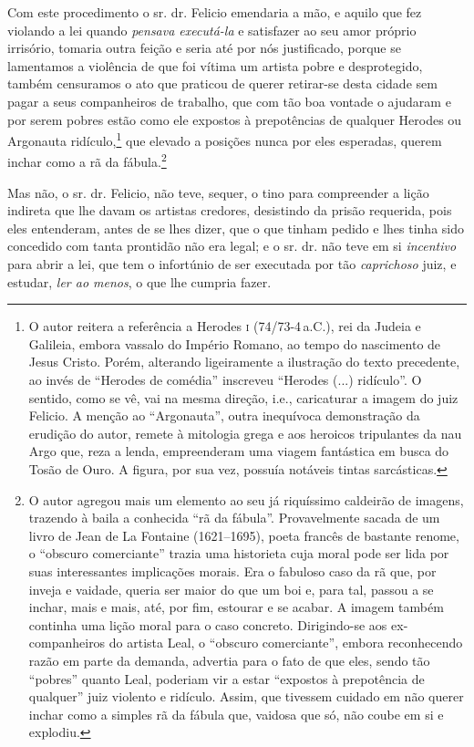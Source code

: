 Com este procedimento o sr. dr. Felicio emendaria a mão, e aquilo que
fez violando a lei quando \emph{pensava executá-la} e satisfazer ao seu
amor próprio irrisório, tomaria outra feição e seria até por nós
justificado, porque se lamentamos a violência de que foi vítima um
artista pobre e desprotegido, também censuramos o ato que praticou de
querer retirar-se desta cidade sem pagar a seus companheiros de
trabalho, que com tão boa vontade o ajudaram e por serem pobres estão
como ele expostos à prepotências de qualquer Herodes ou Argonauta
ridículo,\footnote{ O autor reitera a referência a Herodes \textsc{i} (74/73-4\,a.C.), 
rei da Judeia e Galileia, embora vassalo do Império
  Romano, ao tempo do nascimento de Jesus Cristo. Porém, alterando
  ligeiramente a ilustração do texto precedente, ao invés de ``Herodes de
  comédia'' inscreveu ``Herodes (...) ridículo''. O sentido, como se vê,
  vai na mesma direção, i.e., caricaturar a imagem do juiz Felicio. A
  menção ao ``Argonauta'', outra inequívoca demonstração da erudição do
  autor, remete à mitologia grega e aos heroicos tripulantes da nau Argo
  que, reza a lenda, empreenderam uma viagem fantástica em busca do
  Tosão de Ouro. A figura, por sua vez, possuía notáveis tintas
  sarcásticas.} que elevado a posições nunca por eles esperadas, querem
inchar como a rã da fábula.\footnote{ O autor agregou mais um elemento
  ao seu já riquíssimo caldeirão de imagens, trazendo à baila a
  conhecida ``rã da fábula''. Provavelmente sacada de um livro de Jean de
  La Fontaine (1621--1695), poeta francês de bastante renome, o ``obscuro
  comerciante'' trazia uma historieta cuja moral pode ser lida por suas
  interessantes implicações morais. Era o fabuloso caso da rã que, por
  inveja e vaidade, queria ser maior do que um boi e, para tal, passou a
  se inchar, mais e mais, até, por fim, estourar e se acabar. A imagem
  também continha uma lição moral para o caso concreto. Dirigindo-se aos
  ex-companheiros do artista Leal, o ``obscuro comerciante'', embora
  reconhecendo razão em parte da demanda, advertia para o fato de que
  eles, sendo tão ``pobres'' quanto Leal, poderiam vir a estar ``expostos à
  prepotência de qualquer'' juiz violento e ridículo. Assim, que tivessem
  cuidado em não querer inchar como a simples rã da fábula que, vaidosa
  que só, não coube em si e explodiu.}

Mas não, o sr. dr. Felicio, não teve, sequer, o tino para compreender a
lição indireta que lhe davam os artistas credores, desistindo da prisão
requerida, pois eles entenderam, antes de se lhes dizer, que o que
tinham pedido e lhes tinha sido concedido com tanta prontidão não era
legal; e o sr. dr. não teve em si \emph{incentivo} para abrir a lei, que
tem o infortúnio de ser executada por tão \emph{caprichoso} juiz, e
estudar, \emph{ler ao menos}, o que lhe cumpria fazer.

